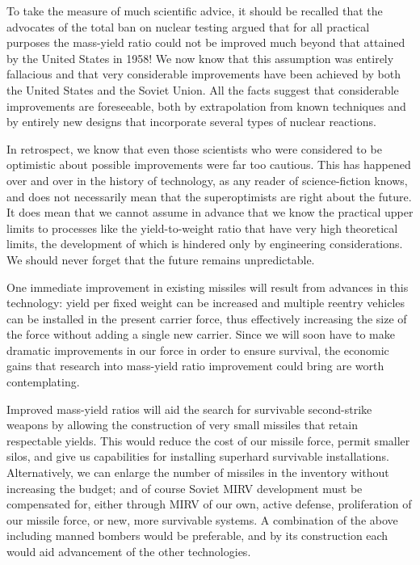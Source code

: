 To take the measure of much scientific advice, it should be recalled that the advocates of the total ban on nuclear testing argued that for all practical purposes the mass-yield ratio could not be improved much beyond that attained by the United States in 1958! We now know that this assumption was entirely fallacious and that very considerable improvements have been achieved by both the United States and the Soviet Union. All the facts suggest that considerable improvements are foreseeable, both by extrapolation from known techniques and by entirely new designs that incorporate several types of nuclear reactions.

In retrospect, we know that even those scientists who were considered to be optimistic about possible improvements were far too cautious. This has happened over and over in the history of technology, as any reader of science-fiction knows, and does not necessarily mean that the superoptimists are right about the future. It does mean that we cannot assume in advance that we know the practical upper limits to processes like the yield-to-weight ratio that have very high theoretical limits, the development of which is hindered only by engineering considerations. We should never forget that the future remains unpredictable.

One immediate improvement in existing missiles will result from advances in this technology: yield per fixed weight can be increased and multiple reentry vehicles can be installed in the present carrier force, thus effectively increasing the size of the force without adding a single new carrier. Since we will soon have to make dramatic improvements in our force in order to ensure survival, the economic gains that research into mass-yield ratio improvement could bring are worth contemplating.

Improved mass-yield ratios will aid the search for survivable second-strike weapons by allowing the construction of very small missiles that retain respectable yields. This would reduce the cost of our missile force, permit smaller silos, and give us capabilities for installing superhard survivable installations. Alternatively, we can enlarge the number of missiles in the inventory without increasing the budget; and of course Soviet MIRV development must be compensated for, either through MIRV of our own, active defense, proliferation of our missile force, or new, more survivable systems. A combination of the above including manned bombers would be preferable, and by its construction each would aid advancement of the other technologies.

